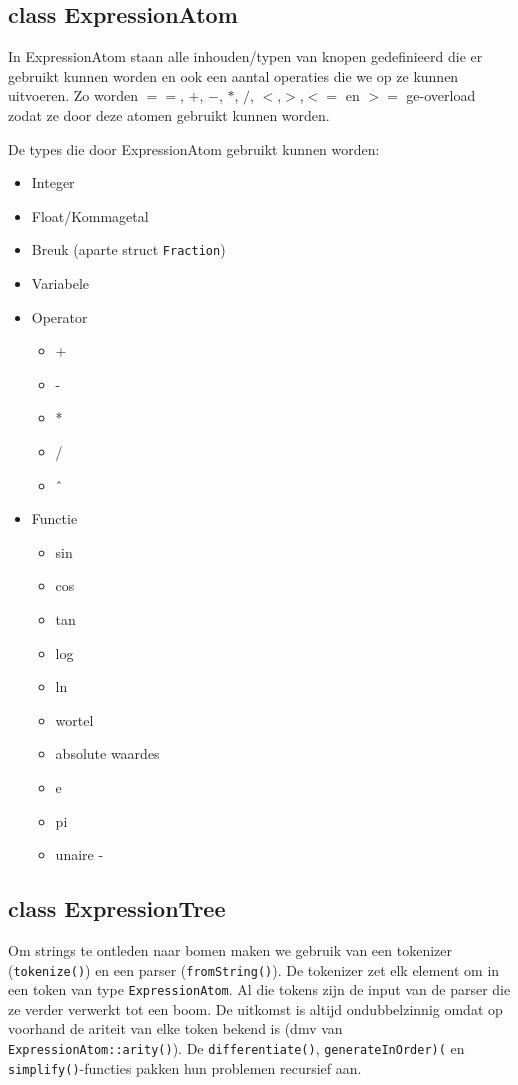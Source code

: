 \documentclass[a4paper,10pt]{article}
\begin{document}
\subsection*{class ExpressionAtom}
In ExpressionAtom staan alle inhouden/typen van knopen gedefinieerd die er gebruikt kunnen worden en ook een aantal operaties die we op ze kunnen uitvoeren.
Zo worden $==$, $+$, $-$, $*$, $/$, $<$,$>$,$<=$ en $>=$ ge-overload zodat ze door deze atomen gebruikt kunnen worden.

\noindent De types die door ExpressionAtom gebruikt kunnen worden:
\begin{itemize}
 \item Integer
 \item Float/Kommagetal
 \item Breuk (aparte struct \texttt{Fraction})
 \item Variabele
 \item Operator
    \begin{itemize}
      \item +
      \item -
      \item *
      \item /
      \item \^\
    \end{itemize}
 \item Functie
  \begin{itemize}
    \item sin
    \item cos
    \item tan
    \item log
    \item ln
    \item wortel
    \item absolute waardes
    \item e
    \item pi
    \item unaire -
  \end{itemize}
\end{itemize}

\subsection*{class ExpressionTree}
Om strings te ontleden naar bomen maken we gebruik van een tokenizer (\texttt{tokenize()}) en een parser (\texttt{fromString()}).
De tokenizer zet elk element om in een token van type \texttt{ExpressionAtom}.
Al die tokens zijn de input van de parser die ze verder verwerkt tot een boom. De uitkomst is altijd ondubbelzinnig omdat op voorhand de ariteit van elke token bekend is (dmv van \texttt{ExpressionAtom::arity()}).
De \texttt{differentiate()}, \texttt{generateInOrder)(} en \texttt{simplify()}-functies pakken hun problemen recursief aan.
\end{document}
